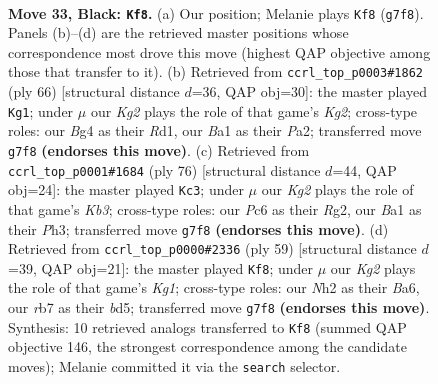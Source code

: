 \documentclass[11pt]{article}
\begin{document}
\clearpage

\begin{figure}[p]\centering
\begin{subfigure}{0.46\textwidth}\centering
\resizebox{\linewidth}{!}{%
\newchessgame
\chessboard[
  setfen={8/1R3pk1/p1p5/P3P1p1/1PN3b1/8/5K1n/b4B2 b - - 0 33},
  showmover=false,
  pgfstyle=straightmove, color=movearrow, markmove={g7-f8}
]}
\caption{}
\end{subfigure}\hfill
\begin{subfigure}{0.46\textwidth}\centering
\resizebox{\linewidth}{!}{%
\newchessgame
\chessboard[
  setfen={8/6bk/1p2B1p1/5pPp/r1n5/6BP/P5K1/3R4 w - - 3 34},
  showmover=false,
  pgfstyle=straightmove, color=movearrow, markmove={g2-g1}
]}
\caption{}
\end{subfigure}
\\[4pt]
\begin{subfigure}{0.46\textwidth}\centering
\resizebox{\linewidth}{!}{%
\newchessgame
\chessboard[
  setfen={1k1n4/1p6/2p5/1NP1pp2/8/1K2P2P/3r1PR1/8 w - - 0 39},
  showmover=false,
  pgfstyle=straightmove, color=movearrow, markmove={b3-c3}
]}
\caption{}
\end{subfigure}\hfill
\begin{subfigure}{0.46\textwidth}\centering
\resizebox{\linewidth}{!}{%
\newchessgame
\chessboard[
  setfen={6k1/p4p2/b7/2pB4/1p3N1P/n2P4/3K1PP1/8 b - - 0 30},
  showmover=false,
  pgfstyle=straightmove, color=movearrow, markmove={g8-f8}
]}
\caption{}
\end{subfigure}
\caption{\textbf{Move 33, Black: \texttt{Kf8}.} (a) Our position; Melanie plays \texttt{Kf8} (\texttt{g7f8}). Panels (b)--(d) are the retrieved master positions whose correspondence most drove this move (highest QAP objective among those that transfer to it). (b) Retrieved from \texttt{ccrl\_top\_p0003\#1862} (ply 66) [structural distance $d$=36, QAP obj=30]: the master played \texttt{Kg1}; under $\mu$ our \emph{Kg2} plays the role of that game's \emph{Kg2}; cross-type roles: our \emph{B}g4 as their \emph{R}d1, our \emph{B}a1 as their \emph{P}a2; transferred move \texttt{g7f8} \textbf{(endorses this move)}. (c) Retrieved from \texttt{ccrl\_top\_p0001\#1684} (ply 76) [structural distance $d$=44, QAP obj=24]: the master played \texttt{Kc3}; under $\mu$ our \emph{Kg2} plays the role of that game's \emph{Kb3}; cross-type roles: our \emph{P}c6 as their \emph{R}g2, our \emph{B}a1 as their \emph{P}h3; transferred move \texttt{g7f8} \textbf{(endorses this move)}. (d) Retrieved from \texttt{ccrl\_top\_p0000\#2336} (ply 59) [structural distance $d$=39, QAP obj=21]: the master played \texttt{Kf8}; under $\mu$ our \emph{Kg2} plays the role of that game's \emph{Kg1}; cross-type roles: our \emph{N}h2 as their \emph{B}a6, our \emph{r}b7 as their \emph{b}d5; transferred move \texttt{g7f8} \textbf{(endorses this move)}. Synthesis: 10 retrieved analogs transferred to \texttt{Kf8} (summed QAP objective 146, the strongest correspondence among the candidate moves); Melanie committed it via the \texttt{search} selector.}
\label{fig:thought-m65}
\end{figure}
\end{document}
